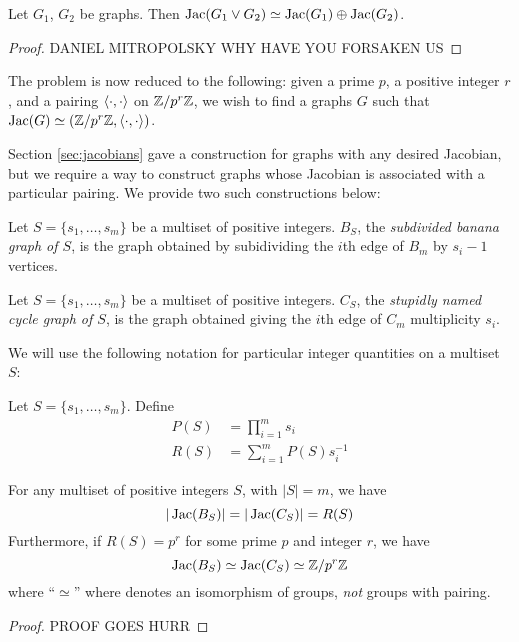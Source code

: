 \documentclass{amsart}
\begin{document}
\begin{prop}
  \label{prop:wedge_sum}
  Let $G_1$, $G_2$ be graphs. Then $\operatorname{Jac}(G_1 \vee G_2) \simeq
  \operatorname{Jac}(G_1) \oplus \operatorname{Jac}(G_2)$. 
\end{prop}
\begin{proof}
  DANIEL MITROPOLSKY WHY HAVE YOU FORSAKEN US
\end{proof}

The problem is now reduced to the following: given a prime $p$, a
positive integer $r$, and a pairing $\langle \cdot, \cdot \rangle$ on
$\mathbb{Z}/p^r\mathbb{Z}$, we wish to find a graphs $G$ such that $\operatorname{Jac}(G) \simeq
(\mathbb{Z}/p^r\mathbb{Z}, \langle \cdot, \cdot \rangle)$.

Section \ref{sec:jacobians} gave a construction for graphs with any
desired Jacobian, but we require a way to construct graphs whose
Jacobian is associated with a particular pairing. We provide two such
constructions below:

\begin{defn}
  Let $S = \{s_1, \ldots, s_m\}$ be a multiset of positive
  integers. $B_S$, the \emph{subdivided banana graph of $S$}, is the
  graph obtained by subidividing the $i$th edge of $B_m$ by $s_i-1$
  vertices. 
\end{defn}

\begin{defn}
  Let $S = \{s_1, \ldots, s_m\}$ be a multiset of positive
  integers. $C_S$, the \emph{stupidly named cycle graph of $S$}, is
  the graph obtained giving the $i$th edge of $C_m$ multiplicity
  $s_i$.
\end{defn}

We will use the following notation for particular integer quantities
on a multiset $S$:
\begin{defn}
  Let $S = \{s_1, \ldots, s_m\}$. Define
  \begin{align*}
    P(S) &= \prod_{i=1}^ms_i\\
    R(S) &= \sum_{i=1}^mP(S)s_i^{-1}
  \end{align*}
\end{defn}

\begin{prop}
  \label{prop:banana}
  For any multiset of positive integers $S$, with $|S| = m$, we have
  \begin{equation*}
    |\operatorname{Jac}(B_S)| = |\operatorname{Jac}(C_S)| = R(S)
  \end{equation*}
  Furthermore, if $R(S) = p^r$ for some prime $p$ and integer $r$, we
  have
  \begin{equation*}
    \operatorname{Jac}(B_S) \simeq \operatorname{Jac}(C_S) \simeq \mathbb{Z}/p^r\mathbb{Z}
  \end{equation*}
  where ``$\simeq$'' where denotes an isomorphism of groups,
  \emph{not} groups with pairing.
\end{prop}
\begin{proof}
  PROOF GOES HURR 
\end{proof}
\end{document}
